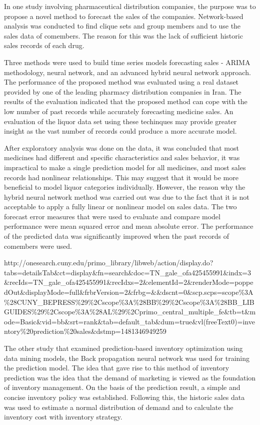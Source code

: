 \documentclass[]{elsarticle} %
\begin{document}
In one study involving pharmaceutical distribution companies, the
purpose was to propose a novel method to forecast the sales of the
companies. Network-based analysis was conducted to find clique sets and
group members and to use the sales data of comembers. The reason for
this was the lack of sufficient historic sales records of each drug.

Three methods were used to build time series models forecasting sales -
ARIMA methodology, neural network, and an advanced hybrid neural network
approach. The performance of the proposed method was evaluated using a
real dataset provided by one of the leading pharmacy distribution
companies in Iran. The results of the evaluation indicated that the
proposed method can cope with the low number of past records while
accurately forecasting medicine sales. An evaluation of the liquor data
set using these techinques may provide greater insight as the vast
number of records could produce a more accurate model.

After exploratory analysis was done on the data, it was concluded that
most medicines had different and specific characteristics and sales
behavior, it was impractical to make a single prediction model for all
medicines, and most sales records had nonlinear relationships. This may
suggest that it would be more beneficial to model liquor categories
individually. However, the reason why the hybrid neural network method
was carried out was due to the fact that it is not acceptable to apply a
fully linear or nonlinear model on sales data. The two forecast error
measures that were used to evaluate and compare model performance were
mean squared error and mean absolute error. The performance of the
predicted data was significantly improved when the past records of
comembers were used.

http://onesearch.cuny.edu/primo\_library/libweb/action/display.do?tabs=detailsTab\&ct=display\&fn=search\&doc=TN\_gale\_ofa425455991\&indx=3\&recIds=TN\_gale\_ofa425455991\&recIdxs=2\&elementId=2\&renderMode=poppedOut\&displayMode=full\&frbrVersion=2\&frbg=\&\&dscnt=0\&scp.scps=scope\%3A\%28CUNY\_BEPRESS\%29\%2Cscope\%3A\%28BB\%29\%2Cscope\%3A\%28BB\_LIBGUIDES\%29\%2Cscope\%3A\%28AL\%29\%2Cprimo\_central\_multiple\_fe\&tb=t\&mode=Basic\&vid=bb\&srt=rank\&tab=default\_tab\&dum=true\&vl(freeText0)=inventory\%20prediction\%20sales\&dstmp=1481346949259

The other study that examined prediction-based inventory optimization
using data mining models, the Back propagation neural network was used
for training the prediction model. The idea that gave rise to this
method of inventory prediction was the idea that the demand of marketing
is viewed as the foundation of inventory management. On the basis of the
prediction result, a simple and concise inventory policy was
established. Following this, the historic sales data was used to
estimate a normal distribution of demand and to calculate the inventory
cost with inventory strategy.
\end{document}
